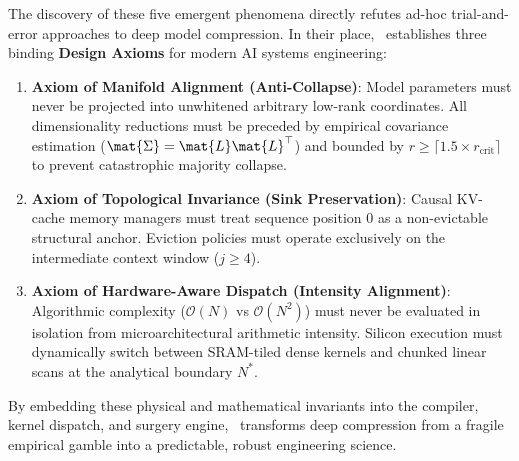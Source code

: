 The discovery of these five emergent phenomena directly refutes ad-hoc trial-and-error approaches to deep model compression. In their place, \neuralops\ establishes three binding \textbf{Design Axioms} for modern AI systems engineering:

\begin{enumerate}
    \item \textbf{Axiom of Manifold Alignment (Anti-Collapse)}: Model parameters must never be projected into unwhitened arbitrary low-rank coordinates. All dimensionality reductions must be preceded by empirical covariance estimation ($\mat{\Sigma} = \mat{L}\mat{L}^\top$) and bounded by $r \ge \lceil 1.5 \times r_{\text{crit}} \rceil$ to prevent catastrophic majority collapse.
    \item \textbf{Axiom of Topological Invariance (Sink Preservation)}: Causal KV-cache memory managers must treat sequence position 0 as a non-evictable structural anchor. Eviction policies must operate exclusively on the intermediate context window ($j \ge 4$).
    \item \textbf{Axiom of Hardware-Aware Dispatch (Intensity Alignment)}: Algorithmic complexity ($\mathcal{O}(N)$ vs $\mathcal{O}(N^2)$) must never be evaluated in isolation from microarchitectural arithmetic intensity. Silicon execution must dynamically switch between SRAM-tiled dense kernels and chunked linear scans at the analytical boundary $N^*$.
\end{enumerate}

By embedding these physical and mathematical invariants into the compiler, kernel dispatch, and surgery engine, \neuralops\ transforms deep compression from a fragile empirical gamble into a predictable, robust engineering science.
